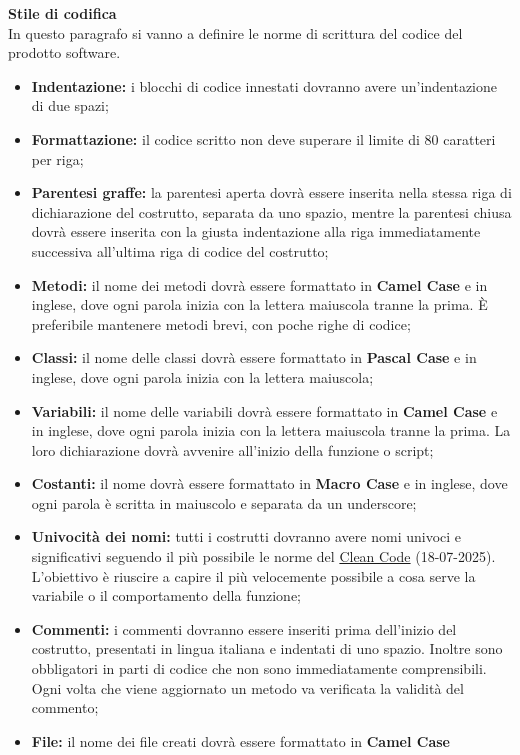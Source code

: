 \noindent \textbf{Stile di codifica}\label{ref:stile}\\
In questo paragrafo si vanno a definire le norme di scrittura del codice del prodotto software.
\begin{itemize}
    \item \textbf{Indentazione:} i blocchi di codice innestati dovranno avere un’indentazione di due spazi;
    \item \textbf{Formattazione:} il codice scritto non deve superare il limite di 80 caratteri per riga;
    \item \textbf{Parentesi graffe:} la parentesi aperta dovrà essere inserita nella stessa riga di dichiarazione del
    costrutto, separata da uno spazio, mentre la parentesi chiusa dovrà essere inserita con la giusta
    indentazione alla riga immediatamente successiva all’ultima riga di codice del costrutto;
    \item \textbf{Metodi:} il nome dei metodi dovrà essere formattato in \textbf{Camel Case} e in inglese, dove ogni parola inizia con la lettera maiuscola tranne la prima.
    È preferibile mantenere metodi brevi, con poche righe di codice;
    \item \textbf{Classi:} il nome delle classi dovrà essere formattato in \textbf{Pascal Case} e in inglese, dove ogni parola inizia con la lettera maiuscola;
    \item \textbf{Variabili:} il nome delle variabili dovrà essere formattato in \textbf{Camel Case} e in inglese, dove ogni parola inizia con la lettera maiuscola tranne la prima.
    La loro dichiarazione dovrà avvenire all’inizio della funzione o script;
    \item \textbf{Costanti:} il nome dovrà essere formattato in \textbf{Macro Case} e in inglese, dove ogni parola è scritta in maiuscolo e separata da un underscore;
    \item \textbf{Univocità dei nomi:} tutti i costrutti dovranno avere nomi univoci e significativi seguendo il più possibile le norme del \href{https://medium.com/@pabashani.herath/clean-code-naming-conventions-4cac223de3c6#77bb}{Clean Code} (18-07-2025).\\
    L'obiettivo è riuscire a capire il più velocemente possibile a cosa serve la variabile o il comportamento della funzione;
    \item \textbf{Commenti:} i commenti dovranno essere inseriti prima dell’inizio del costrutto, presentati in lingua
    italiana e indentati di uno spazio. Inoltre sono obbligatori in parti di codice che non sono immediatamente comprensibili.
    Ogni volta che viene aggiornato un metodo va verificata la validità del commento;
    \item \textbf{File:} il nome dei file creati dovrà essere formattato in \textbf{Camel Case}
\end{itemize} 
\vspace{1em}

